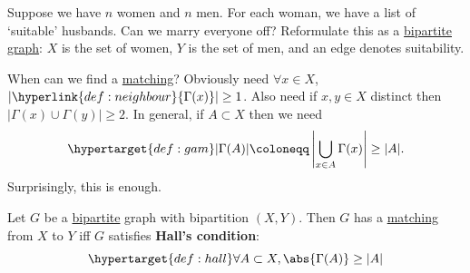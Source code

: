 \documentclass{article}
\begin{document}
Suppose we have $n$ women and $n$ men. For each woman, we have a list of `suitable' husbands. Can we marry everyone off?
Reformulate this as a \hyperlink{def:bipartite}{bipartite graph}: $X$ is the set of women, $Y$ is the set of men, and an edge denotes suitability.

When can we find a \hyperlink{def:matching}{matching}?
Obviously need $\forall x \in X$, $|\hyperlink{def:neighbour}{\Gamma(x)}| \geq 1$.
Also need if $x,y \in X$ distinct then $|\Gamma(x) \cup \Gamma(y)| \geq 2$.
In general, if $A \subset X$ then we need
\begin{equation*}
    \hypertarget{def:gam}|\Gamma(A)| \coloneqq \left|\bigcup_{x \in A} \Gamma(x)\right| \geq |A|.
\end{equation*}
Surprisingly, this is enough.
\begin{nthm}\label{thm:31}
    Let $G$ be a \hyperlink{def:bipartite}{bipartite} graph with bipartition $(X,Y)$.
    Then $G$ has a \hyperlink{def:matching}{matching} from $X$ to $Y$ iff $G$ satisfies \textbf{Hall's condition}:
    \begin{equation*}
        \hypertarget{def:hall}\forall A \subset X, \abs{\Gamma(A)} \geq |A|
    \end{equation*}
\end{nthm}
\end{document}
